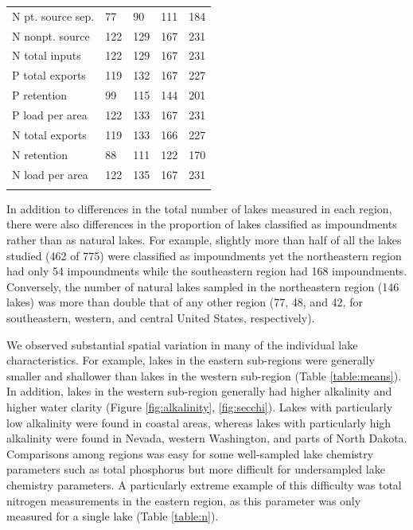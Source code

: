 \documentclass[journal abbreviations, manuscript]{copernicus}
\begin{document}
\begin{table}
\begin{tabular}{lllll}
N pt. source sep. & 77 & 90 & 111 & 184\\

N nonpt. source & 122 & 129 & 167 & 231\\

N total inputs & 122 & 129 & 167 & 231\\

P total exports & 119 & 132 & 167 & 227\\

P retention & 99 & 115 & 144 & 201\\

P load per area & 122 & 133 & 167 & 231\\

N total exports & 119 & 133 & 166 & 227\\

N retention & 88 & 111 & 122 & 170\\

N load per area & 122 & 135 & 167 & 231\\
\bottomhline
\end{tabular}
\end{table}

In addition to differences in the total number of lakes measured in each region, there were also differences in the proportion of lakes classified as impoundments rather than as natural lakes. For example, slightly more than half of all the lakes studied (462 of 775) were classified as impoundments yet the northeastern region had only 54 impoundments while the southeastern region had 168 impoundments. Conversely, the number of natural lakes sampled in the northeastern region (146 lakes) was more than double that of any other region (77, 48, and 42, for southeastern, western, and central United States, respectively).

We observed substantial spatial variation in many of the individual lake characteristics. For example, lakes in the eastern sub-regions were generally smaller and shallower than lakes in the western sub-region (Table \ref{table:means}). In addition, lakes in the western sub-region generally had higher alkalinity and higher water clarity (Figure \ref{fig:alkalinity}, \ref{fig:secchi}). Lakes with particularly low alkalinity were found in coastal areas, whereas lakes with particularly high alkalinity were found in Nevada, western Washington, and parts of North Dakota. Comparisons among regions was easy for some well-sampled lake chemistry parameters such as total phosphorus but more difficult for undersampled lake chemistry parameters. A particularly extreme example of this difficulty was total nitrogen measurements in the eastern region, as this parameter was only measured for a single lake (Table \ref{table:n}). 
\end{document}
